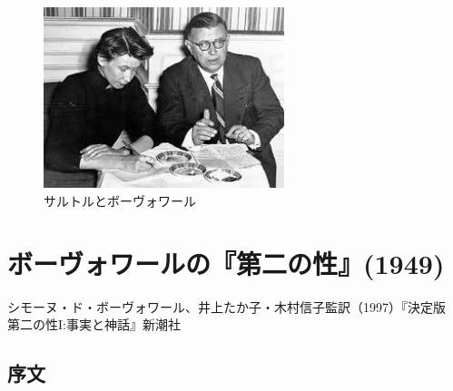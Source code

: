 \begin{figure}[htbp]
  \centering
     \includegraphics[width=70mm]{images/sartre-beauvoir.jpg}
  \caption{サルトルとボーヴォワール}
\end{figure}

\newpage{}

\section{ボーヴォワールの『第二の性』(1949)}



シモーヌ・ド・ボーヴォワール、井上たか子・木村信子監訳（1997）『決定版　第二の性I:事実と神話』新潮社

\subsection{序文}

